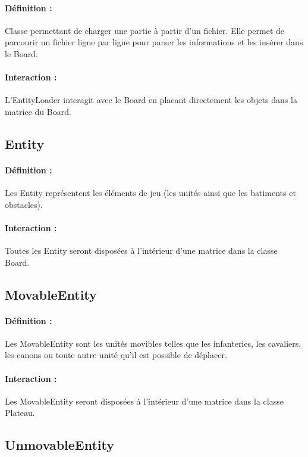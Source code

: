 			\paragraph{Définition :}
			Classe permettant de charger une partie à partir d'un fichier.
			Elle permet de parcourir un fichier ligne par ligne pour parser les informations et les insérer dans le Board.
			\paragraph{Interaction :}
			L'EntityLoader interagit avec le Board en placant directement les objets dans la matrice du Board.

		\subsection*{Entity}

			\paragraph{Définition :}
			Les Entity représentent les éléments de jeu (les unités ainsi que les batiments et obstacles).
			\paragraph{Interaction :}
			Toutes les Entity seront disposées à l'intérieur d'une matrice dans la classe Board.

		\subsection*{MovableEntity}

			\paragraph{Définition :}
			Les MovableEntity sont les unités movibles telles que les infanteries, les cavaliers, les canons ou toute autre unité 
			qu'il est possible de déplacer.
			\paragraph{Interaction :}
			Les MovableEntity seront disposées à l'intérieur d'une matrice dans la classe Plateau.

		\subsection*{UnmovableEntity}

